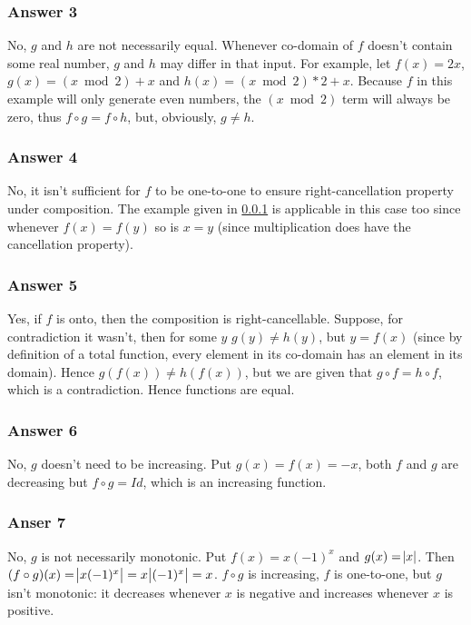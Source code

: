 \documentclass[a4paper]{article}
\begin{document}
\subsubsection{Answer 3}
\label{sec:orgheadline4}
No, \(g\) and \(h\) are not necessarily equal.  Whenever co-domain of \(f\)
doesn't contain some real number, \(g\) and \(h\) may differ in that input.
For example, let \(f(x) = 2x\), \(g(x) = (x \bmod 2) + x\) and
\(h(x) = (x \bmod 2) * 2 + x\).  Because \(f\) in this example will only
generate even numbers, the \((x \bmod 2)\) term will always be zero,
thus \(f \circ g = f \circ h\), but, obviously, \(g \neq h\).

\subsubsection{Answer 4}
\label{sec:orgheadline5}
No, it isn't sufficient for \(f\) to be one-to-one to ensure right-cancellation
property under composition.  The example given in \ref{sec:orgheadline4} is applicable
in this case too since whenever \(f(x) = f(y)\) so is \(x = y\) (since multiplication
does have the cancellation property).

\subsubsection{Answer 5}
\label{sec:orgheadline6}
Yes, if \(f\) is onto, then the composition is right-cancellable.  Suppose,
for contradiction it wasn't, then for some \(y\) \(g(y) \neq h(y)\), but
\(y = f(x)\) (since by definition of a total function, every element in
its co-domain has an element in its domain).  Hence \(g(f(x)) \neq h(f(x))\),
but we are given that \(g \circ f = h \circ f\), which is a contradiction.
Hence functions are equal.

\subsubsection{Answer 6}
\label{sec:orgheadline7}
No, \(g\) doesn't need to be increasing.  Put \(g(x) = f(x) = -x\), both \(f\)
and \(g\) are decreasing but \(f \circ g = Id\), which is an increasing function.

\subsubsection{Anser 7}
\label{sec:orgheadline8}
No, \(g\) is not necessarily monotonic.  Put \(f(x) = x(-1)^x\) and \(g(x) = \abs{x}\).
Then \((f \circ g)(x) = \abs{x(-1)^x} = x\abs{(-1)^x} = x\).  \(f \circ g\) is
increasing, \(f\) is one-to-one, but \(g\) isn't monotonic: it decreases whenever
\(x\) is negative and increases whenever \(x\) is positive.
\end{document}
